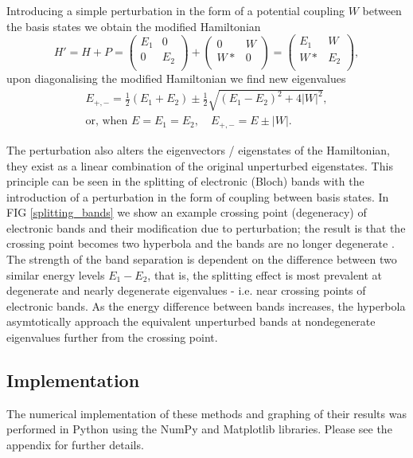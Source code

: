 \documentclass[12pt]{report} %
\begin{document}
Introducing a simple perturbation in the form of a potential coupling $W$ between the basis states we obtain the modified Hamiltonian
%
\begin{equation}
  H' = H + P =\begin{pmatrix}
    E_1 & 0 \\
    0 & E_2 \\
  \end{pmatrix}
  +\begin{pmatrix}
    0 & W \\
    W* & 0 \\
  \end{pmatrix}
  =\begin{pmatrix}
    E_1 & W \\
    W* & E_2 \\
  \end{pmatrix},
  \label{perturbation_matrix}
\end{equation}
%
upon diagonalising the modified Hamiltonian we find new eigenvalues
%
\begin{equation}
\begin{gathered}
  E_{+, -} = {\frac{1}{2}(E_1 + E_2)} \pm {\frac{1}{2}\sqrt{(E_1-E_2)^2+4|W|^2}},\\
  \text{or, when } E = E_1 = E_2, \quad E_{+,-} = E \pm |W|.
\end{gathered}
  \label{perturbation_energy}
\end{equation}

The perturbation also alters the eigenvectors / eigenstates of the Hamiltonian, they exist as a linear combination of the original unperturbed eigenstates. This principle can be seen in the splitting of electronic (Bloch) bands with the introduction of a perturbation in the form of coupling between basis states. In FIG \ref{splitting_bands} we show an example crossing point (degeneracy) of electronic bands and their modification due to perturbation; the result is that the crossing point becomes two hyperbola and the bands are no longer degenerate \cite{Cohen-Tannoudji2006, Verhoeven1996}. The strength of the band separation is dependent on the difference between two similar energy levels $E_1 - E_2$, that is, the splitting effect is most prevalent at degenerate and nearly degenerate eigenvalues - i.e. near crossing points of electronic bands. As the energy difference between bands increases, the hyperbola asymtotically approach the equivalent unperturbed bands at nondegenerate eigenvalues further from the crossing point.

\subsection*{Implementation}
The numerical implementation of these methods and graphing of their results was performed in Python using the NumPy and Matplotlib libraries. Please see the appendix for further details.
\end{document}
